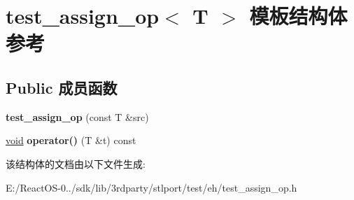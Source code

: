 \hypertarget{structtest__assign__op}{}\section{test\+\_\+assign\+\_\+op$<$ T $>$ 模板结构体 参考}
\label{structtest__assign__op}
\subsection*{Public 成员函数}
\begin{DoxyCompactItemize}
\item 
\mbox{\label{structtest__assign__op_a38617655968bdda8a286fd1f189e7fc9}} 
{\bfseries test\+\_\+assign\+\_\+op} (const T \&src)
\item 
\mbox{\label{structtest__assign__op_a2a575047e015177b9b6f63ae37e3ecad}} 
\hyperlink{interfacevoid}{void} {\bfseries operator()} (T \&t) const
\end{DoxyCompactItemize}


该结构体的文档由以下文件生成\+:\begin{DoxyCompactItemize}
\item 
E\+:/\+React\+O\+S-\/0../sdk/lib/3rdparty/stlport/test/eh/test\+\_\+assign\+\_\+op.\+h\end{DoxyCompactItemize}
